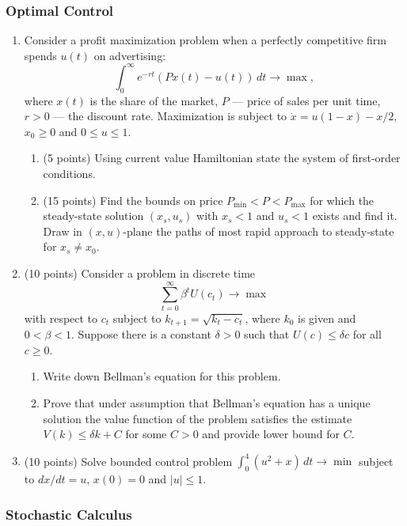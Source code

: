 \documentclass[12pt, a4paper]{article}
\begin{document}
\subsubsection*{Optimal Control}

\begin{enumerate}
  \item Consider a profit maximization problem when a perfectly competitive firm spends $u(t)$ on advertising:
  \[
  \int_0^{\infty} e^{-rt} (Px(t) - u(t)) \, dt \to \max,   
  \]
where $x(t)$ is the share of the market, $P$ — price of sales per unit time, $r > 0$ — the discount rate. 
  Maximization is subject to $\dot x = u(1-x) - x/2$, $x_0\geq 0$ and $0 \leq u \leq 1$. 
  \begin{enumerate}
    \item {(5 points)} Using current value Hamiltonian state the system of first-order conditions.  
    \item {(15 points)} Find the bounds on price $P_{\min} < P < P_{\max}$ 
    for which the steady-state solution $(x_s, u_s)$ with $x_s < 1$ and $u_s<1$ exists and find it. 
    Draw in $(x,u)$-plane the paths of most rapid approach to steady-state for $x_s \neq x_0$.
  \end{enumerate}

\item {(10 points)} Consider a problem in discrete time 
\[
  \sum_{t=0}^{\infty} \beta^t U(c_t) \to \max
\] 
with respect to  $c_t$
subject to $k_{t+1} = \sqrt{k_t - c_t}$, 
where $k_0$ is given and $0 < \beta < 1$. 
Suppose there is a constant $\delta > 0$ such that $U(c) \leq \delta c$ for all $c\geq 0$. 
\begin{enumerate}
  \item Write down Bellman’s equation for this problem. 
  \item Prove that under assumption that Bellman’s equation has 
  a unique solution the value function of the problem satisfies the estimate $V(k) \leq \delta k + C$ 
  for some $C>0$ and provide lower bound for $C$.  
\end{enumerate}

\item {(10 points)} Solve bounded control problem $\int_0^4 (u^2 + x) \, dt \to \min$ 
subject to $dx/dt = u$, $x(0)=0$ and $|u| \leq 1$.


\end{enumerate}

\subsubsection*{Stochastic Calculus}
\end{document}
